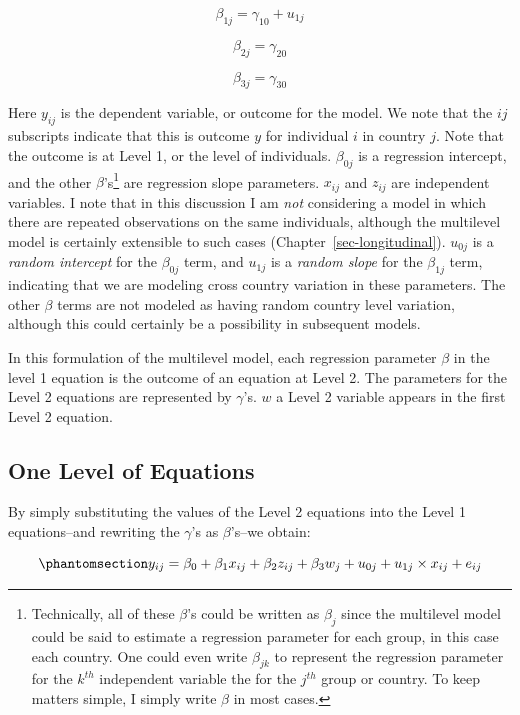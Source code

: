 \documentclass[
  letterpaper,
  DIV=11,
  numbers=noendperiod]{scrreprt}
\begin{document}
\[\beta_{1j} = \gamma_{10} + u_{1j}\]

\[\beta_{2j} = \gamma_{20}\]

\[\beta_{3j} = \gamma_{30}\]

Here \(y_{ij}\) is the dependent variable, or outcome for the model. We
note that the \(ij\) subscripts indicate that this is outcome \(y\) for
individual \(i\) in country \(j\). Note that the outcome is at Level 1,
or the level of individuals. \(\beta_{0j}\) is a regression intercept,
and the other \(\beta\)'s\footnote{Technically, all of these \(\beta\)'s
  could be written as \(\beta_j\) since the multilevel model could be
  said to estimate a regression parameter for each group, in this case
  each country. One could even write \(\beta_{jk}\) to represent the
  regression parameter for the \(k^{th}\) independent variable the for
  the \(j^{th}\) group or country. To keep matters simple, I simply
  write \(\beta\) in most cases.} are regression slope parameters.
\(x_{ij}\) and \(z_{ij}\) are independent variables. I note that in this
discussion I am \emph{not} considering a model in which there are
repeated observations on the same individuals, although the multilevel
model is certainly extensible to such cases
(Chapter~\ref{sec-longitudinal}). \(u_{0j}\) is a \emph{random
intercept} for the \(\beta_{0j}\) term, and \(u_{1j}\) is a \emph{random
slope} for the \(\beta_{1j}\) term, indicating that we are modeling
cross country variation in these parameters. 
 The other \(\beta\) terms are not modeled as having
random country level variation, although this could certainly be a
possibility in subsequent models.

In this formulation of the multilevel model, each regression parameter
\(\beta\) in the level 1 equation is the outcome of an equation at Level
2. The parameters for the Level 2 equations are represented by
\(\gamma\)'s. \(w\) a Level 2 variable appears in the first Level 2
equation.

\subsection{One Level of Equations}\label{one-level-of-equations}

By simply substituting the values of the Level 2 equations into the
Level 1 equations--and rewriting the \(\gamma\)'s as \(\beta\)'s--we
obtain:

\begin{equation}\phantomsection\label{eq-MLM}{y_{ij} = \beta_0 + \beta_1 x_{ij} + \beta_2 z_{ij} + \beta_3 w_{j} + u_{0j} + u_{1j} \times x_{ij} + e_{ij}}\end{equation}
\end{document}

